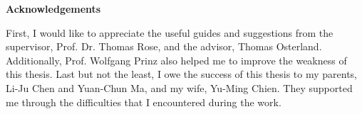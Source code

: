 \thispagestyle{plain}
\vspace*{\fill}
    \begin{center}
        \Large
        \textbf{Acknowledgements}
    \end{center}

    \vspace{1cm}

    First, I would like to appreciate the useful guides and suggestions from the supervisor, Prof. Dr. Thomas Rose, and the advisor, Thomas Osterland. Additionally, Prof. Wolfgang Prinz also helped me to improve the weakness of this thesis. Last but not the least, I owe the success of this thesis to my parents, Li-Ju Chen and Yuan-Chun Ma, and my wife, Yu-Ming Chien. They supported me through the difficulties that I encountered during the work.
\vspace*{\fill}
